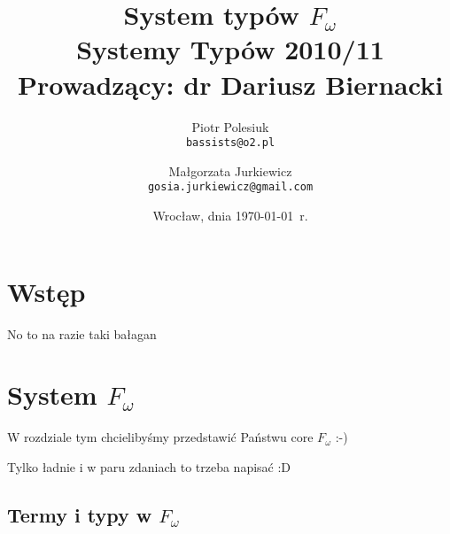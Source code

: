 \documentclass[11pt,leqno]{article}
\title{{\textbf{System typów $F_{\omega}$}}\\[1ex]
       {\Large Systemy Typów 2010/11}\\[-1ex]
       {\large Prowadzący: dr Dariusz Biernacki}}
\author{Piotr Polesiuk \\ \texttt{bassists@o2.pl} 
   \and Małgorzata Jurkiewicz \\ \texttt{gosia.jurkiewicz@gmail.com}}
\date{Wrocław, dnia \today\ r.}
\begin{document}
\thispagestyle{empty}
\maketitle

\pagebreak

\theoremstyle{plain}
\newtheorem{twierdzenie}{Twierdzenie}
\newtheorem{lemat}{Lemat}

\theoremstyle{definition}
\newtheorem{definicja}{Definicja}

\section{Wstęp}
\setcounter{equation}{0}


No to na razie taki bałagan



\section{System $F_{\omega}$}                                 
\setcounter{equation}{0}

W rozdziale tym chcielibyśmy przedstawić Państwu core $F_\omega$ :-) 

Tylko ładnie i w paru zdaniach to trzeba napisać :D

\subsection {Termy i typy w $F_\omega$}
\end{document}
